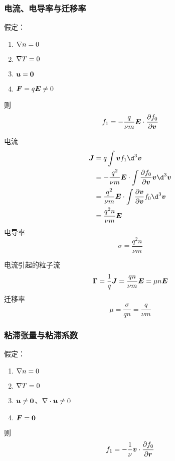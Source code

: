 \subsubsection{电流、电导率与迁移率}

假定：
\begin{enumerate}
    \item $\nabla {n} = 0$
    \item $\nabla {T} = 0$
    \item $\bm{u} = \bm{0}$
    \item $\bm{F} = q\bm{E} \neq 0$
\end{enumerate}
则
\begin{equation}
f_1 = - \frac{q}{\nu m} \bm{E} \cdot \pdv{f_0}{\bm{v}}
\end{equation}

电流
\begin{equation}\begin{aligned}
\vector{J} &= q \int \vector{v} f_1 \d^3\vector{v} \\
&= - \frac{q^2}{\nu m} \vector{E} \cdot
\int \pdv{f_0}{\vector{v}} \vector{v} \d^3\vector{v} \\
&= \frac{q^2}{\nu m} \vector{E} \cdot
\int \pdv{\vector{v}}{\vector{v}} f_0 \d^3\vector{v} \\
&= \frac{q^2 n}{\nu m} \vector{E}
\end{aligned}\end{equation}
电导率
\begin{equation}
\sigma = \frac{q^2 n}{\nu m}
\end{equation}

电流引起的粒子流
\begin{equation}
\bm{\Gamma} = \frac{1}{q} \bm{J}
= \frac{q n}{\nu m} \bm{E} = \mu n \bm{E}
\end{equation}
迁移率
\begin{equation}
\mu = \frac{\sigma}{q n} = \frac{q}{\nu m}
\end{equation}

\subsubsection{粘滞张量与粘滞系数}

假定：
\begin{enumerate}
    \item $\nabla {n} = 0$
    \item $\nabla {T} = 0$
    \item $\bm{u} \neq \bm{0}$、$\nabla \cdot {\bm{u}} \neq 0$
    \item $\bm{F} = \bm{0}$
\end{enumerate}
则
\begin{equation}
f_1 = - \frac{1}{\nu} \bm{v} \cdot \pdv{f_0}{\bm{r}}
\end{equation}


